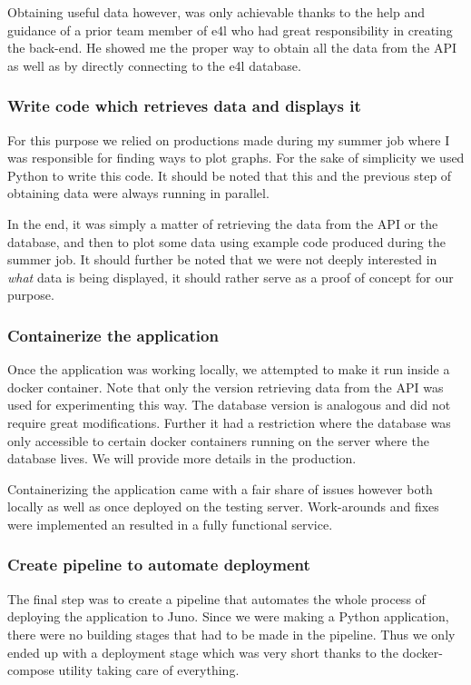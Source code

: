 Obtaining useful data however, was only achievable thanks to the help
and guidance of a prior team member of \gls{e4l} who had great
responsibility in creating the back-end. He showed me the proper way to
obtain all the data from the API as well as by directly connecting to
the \gls{e4l} database.

\subsubsection{Write code which retrieves data and displays it}

For this purpose we relied on productions made during my summer job
where I was responsible for finding ways to plot graphs. For the sake
of simplicity we used Python to write this code. It should be noted
that this and the previous step of obtaining data were always running
in parallel.

In the end, it was simply a matter of retrieving the data from the API
or the database, and then to plot some data using example code
produced during the summer job. It should further be noted that we
were not deeply interested in \textit{what} data is being displayed, it should
rather serve as a proof of concept for our purpose.

\subsubsection{Containerize the application}

Once the application was working locally, we attempted to make it run
inside a docker container. Note that only the version retrieving data
from the API was used for experimenting this way. The database version
is analogous and did not require great modifications. Further it had a
restriction where the database was only accessible to certain docker
containers running on the server where the database lives. We will
provide more details in the production.

Containerizing the application came with a fair share of issues
however both locally as well as once deployed on the testing server.
Work-arounds and fixes were implemented an resulted in a fully
functional service.

\subsubsection{Create pipeline to automate deployment}

The final step was to create a pipeline that automates the whole
process of deploying the application to Juno. Since we were making a
Python application, there were no building stages that had to be made
in the pipeline. Thus we only ended up with a deployment stage which
was very short thanks to the docker-compose utility taking care of
everything.

